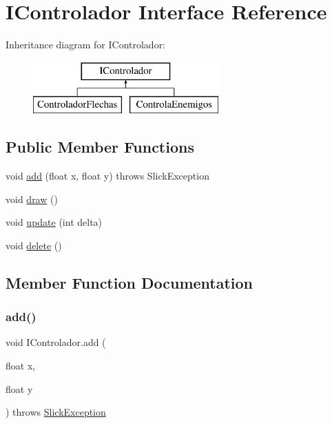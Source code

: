 \hypertarget{interface_i_controlador}{}\section{I\+Controlador Interface Reference}
\label{interface_i_controlador}
Inheritance diagram for I\+Controlador\+:\begin{figure}[H]
\begin{center}
\leavevmode
\includegraphics[height=2.000000cm]{interface_i_controlador}
\end{center}
\end{figure}
\subsection*{Public Member Functions}
\begin{DoxyCompactItemize}
\item 
void \mbox{\hyperlink{interface_i_controlador_af6e795781b2eead3e435cbbdd61bde41}{add}} (float x, float y)  throws Slick\+Exception
\item 
void \mbox{\hyperlink{interface_i_controlador_a220648ff53334f380d52e2d2ec78e2e8}{draw}} ()
\item 
void \mbox{\hyperlink{interface_i_controlador_a06ccd4613ae1662a3a45620104c5224b}{update}} (int delta)
\item 
void \mbox{\hyperlink{interface_i_controlador_a6a799d4959078e9b84d9de7fee44e0ba}{delete}} ()
\end{DoxyCompactItemize}


\subsection{Member Function Documentation}
\mbox{\label{interface_i_controlador_af6e795781b2eead3e435cbbdd61bde41}} 
\subsubsection{\texorpdfstring{add()}{add()}}
{\footnotesize\ttfamily void I\+Controlador.\+add (\begin{DoxyParamCaption}\item[{float}]{x,  }\item[{float}]{y }\end{DoxyParamCaption}) throws \mbox{\hyperlink{classorg_1_1newdawn_1_1slick_1_1_slick_exception}{Slick\+Exception}}}



